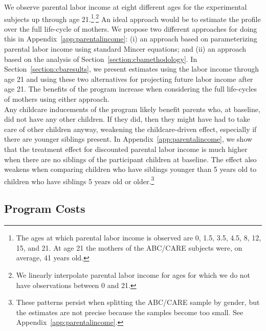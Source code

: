 \noindent We observe parental labor income at eight different ages for the experimental subjects up through age 21.\footnote{The ages at which parental labor income is observed are 0, 1.5, 3.5, 4.5, 8, 12, 15, and 21. At age 21 the mothers of the ABC/CARE subjects were, on average, 41 years old.}$^,$\footnote{We linearly interpolate parental labor income for ages for which we do not have observations between 0 and 21.} An ideal approach would be to estimate the profile over the full life-cycle of mothers. We propose two different approaches for doing this in Appendix~\ref{app:parentalincome}: (i) an approach based on parameterizing parental labor income using standard Mincer equations; and (ii) an approach based on the analysis of Section~\ref{section:cbamethodology}. In Section~\ref{section:cbaresults}, we present estimates using the labor income through age 21 and using these two alternatives for projecting future labor income after age 21. The benefits of the program increase when considering the full life-cycles of mothers using either approach.\\

\noindent Any childcare inducements of the program likely benefit parents who, at baseline, did not have any other children. If they did, then they might have had to take care of other children anyway, weakening the childcare-driven effect, especially if there are younger siblings present. In Appendix~\ref{app:parentalincome}, we show that the treatment effect for discounted parental labor income is much higher when there are no siblings of the participant children at baseline. The effect also weakens when comparing children who have siblings younger than 5 years old to children who have siblings 5 years old or older.\footnote{These patterns persist when splitting the ABC/CARE sample by gender, but the estimates are not precise because the samples become too small. See Appendix~\ref{app:parentalincome}.}

\subsection{Program Costs} \label{section:programscosts}

